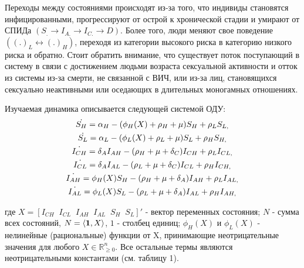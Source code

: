 \documentclass[a4paper]{report}
\begin{document}
	 
	 Переходы между состояниями происходят из-за того, что индивиды становятся инфицированными, прогрессируют от острой к хронической стадии и умирают от СПИДа $(S_. \rightarrow I_{A.} \rightarrow I_{C.} \rightarrow D)$. Более того, люди меняют свое поведение $((.)_L \leftrightarrow (.)_H)$, переходя из категории высокого риска в категорию низкого риска и обратно. Стоит обратить внимание, что существует поток поступающий в систему в связи с достижением людьми возраста сексуальной активности и отток из системы из-за смерти, не связанной с ВИЧ, или из-за лиц, становящихся сексуально неактивными или оседающих в длительных моногамных отношениях.
	
	Изучаемая динамика описывается следующей системой ОДУ:
	\begin{gather}
	\dot{S_H} = \alpha_H - (\phi_H(X) + \rho_H + \mu)S_H + \rho_L S_{L,} \notag \\	
	\dot{S_L} = \alpha_L - (\phi_L(X) + \rho_L + \mu)S_L + \rho_H S_{H,}  \notag \\
	\dot{I_{CH}} = \delta_A I_{AH} - (\rho_H + \mu + \delta_C)I_{CH} + \rho_L I_{CL,} \label{restr} \\
	\dot{I_{CL}} = \delta_A I_{AL} - (\rho_L + \mu + \delta_C)I_{CL} + \rho_H I_{CH,} \notag \\
	\dot{I_{AH}} = \phi_H(X)S_H - (\rho_H + \mu + \delta_A)I_{AH} + \rho_L I_{AL,} \notag \\
	\dot{I_{AL}} = \phi_L(X)S_L - (\rho_L + \mu + \delta_A)I_{AL} + \rho_H I_{AH,} \notag
	\end{gather}
	
	
	где $X \! = \! \left[I_{CH}\;\;I_{CL}\;\;I_{AH}\;\;I_{AL}\;\;S_H\;\;S_L\right]'$ - вектор переменных состояния; $N$ - сумма всех состояний, $N = \langle \mbox{\boldmath$1$} , X\rangle$, \mbox{\boldmath$1$} - столбец единиц;
	$\phi_H(X)$ и $\phi_L(X)$ - нелинейные (рациональные) функции от X, принимающие неотрицательные значения для любого $X \in \mathbb{R}^n_{\geq 0}$.
	Все остальные термы являются неотрицательными константами (см. таблицу 1).
	
	
	
	
	
	
	
\end{document}
